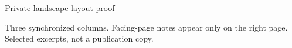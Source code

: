 \documentclass[10pt,twoside,legalpaper,landscape]{article}
\begin{document}
\ifdefined\DoMeasure
  
\else
  \thispagestyle{empty}\vspace*{1.05in}
  {\color{accent}\large Private landscape layout proof\par}\vspace{.20in}
  {\fontsize{48}{52}\selectfont \BookTitle\par}\vspace{.15in}
  \vspace{.35in}{\large Landscape US Legal, 14 × 8.5 in\par}
  \vspace{.10in}{\latinlabel\par}
  \vspace{.25in}Three synchronized columns. Facing-page notes appear only on the right page. Selected excerpts, not a publication copy.\par
  \vspace{.1in}
  
  \vspace{.18in}{\small\PublicationNotice\par}
  \clearpage
  
\fi
\end{document}
